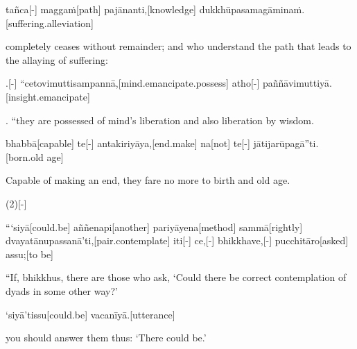 \begin{samepage}
\begingl[glneveryline={\PaliGlossA,\PaliGlossB}]
tañca[-] maggaṁ[path] pajānanti,[knowledge] dukkhūpasamagāminaṁ.[suffering.alleviation]
\endgl
\nopagebreak
\linespread{0.5}
\begin{spacin}{0.2}
{\PaliGlossFT completely ceases without remainder;  and who understand the path  that leads to the allaying of suffering:}
\end{spacin}
\vskip 12pt
\end{samepage}
\begin{samepage}
.[-] “cetovimuttisampannā,[mind.emancipate.possess] atho[-] paññāvimuttiyā.[insight.emancipate]
\endgl
\nopagebreak
\linespread{0.5}
\begin{spacin}{0.2}
{. “they are possessed of mind’s liberation  and also liberation by wisdom.}
\end{spacin}
\vskip 12pt
\end{samepage}
\begin{samepage}
\begingl[glneveryline={\PaliGlossA,\PaliGlossB}]
bhabbā[capable] te[-] antakiriyāya,[end.make] na[not] te[-] jātijarūpagā”ti.[born.old age]
\endgl
\nopagebreak
\linespread{0.5}
\begin{spacin}{0.2}
{\PaliGlossFT Capable of making an end, they fare no more to birth and old age.}
\end{spacin}
\vskip 12pt
\end{samepage}
\vskip 0.2in
\begin{samepage}
\begingl[glneveryline={\PaliGlossA,\PaliGlossB}]
(2)[-]
\endgl
\nopagebreak
\linespread{0.5}
\begin{spacin}{0.2}
{\PaliGlossFT [2. Acquisition]}
\end{spacin}
\vskip 12pt
\end{samepage}
\begin{samepage}
\begingl[glneveryline={\PaliGlossA,\PaliGlossB}]
“‘siyā[could.be] aññenapi[another] pariyāyena[method] sammā[rightly] dvayatānupassanā’ti,[pair.contemplate] iti[-] ce,[-] bhikkhave,[-] pucchitāro[asked] assu;[to be]
\endgl
\nopagebreak
\linespread{0.5}
\begin{spacin}{0.2}
{\PaliGlossFT “If, bhikkhus, there are those who ask, ‘Could there be correct contemplation of dyads in some other way?’}
\end{spacin}
\vskip 12pt
\end{samepage}
\begin{samepage}
\begingl[glneveryline={\PaliGlossA,\PaliGlossB}]
‘siyā’tissu[could.be] vacanīyā.[utterance]
\endgl
\nopagebreak
\linespread{0.5}
\begin{spacin}{0.2}
{\PaliGlossFT you should answer them thus: ‘There could be.’}
\end{spacin}
\vskip 12pt
\end{samepage}
